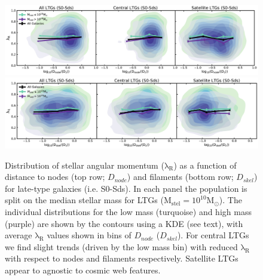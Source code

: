 \begin{figure}
    \centering\includegraphics[width=\linewidth]{thesis/latex/cw_spin/ltg_lambdaR_dnode_mass_split_3sigma.pdf} \\
    \centering\includegraphics[width=\linewidth]{thesis/latex/cw_spin/ltg_lambdaR_dskel_mass_split_3sigma.pdf}
    \caption{Distribution of stellar angular momentum ($\mathrm{\lambda_R}$) as a function of distance to nodes (top row; $D_{node}$) and filaments (bottom row; $D_{skel}$) for late-type galaxies (i.e. S0-Sds). In each panel the population is split on the median stellar mass for LTGs ($\mathrm{M_{stel} = 10^{10}M_{\odot}}$). The individual distributions for the low mass (turquoise) and high mass (purple) are shown by the contours using a KDE (see text), with average $\mathrm{\lambda_R}$ values shown in bins of $D_{node}$ ($D_{skel}$). For central LTGs we find slight trends (driven by the low mass bin) with reduced $\mathrm{\lambda_R}$ with respect to nodes and filaments respectively. Satellite LTGs appear to agnostic to cosmic web features.}
\label{fig:ltg_lambdaR_skel}
\end{figure} 

